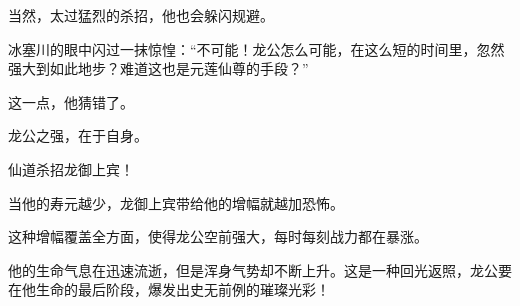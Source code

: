 \begin{this_body}
当然，太过猛烈的杀招，他也会躲闪规避。

冰塞川的眼中闪过一抹惊惶：“不可能！龙公怎么可能，在这么短的时间里，忽然强大到如此地步？难道这也是元莲仙尊的手段？”

这一点，他猜错了。

龙公之强，在于自身。

仙道杀招龙御上宾！

当他的寿元越少，龙御上宾带给他的增幅就越加恐怖。

这种增幅覆盖全方面，使得龙公空前强大，每时每刻战力都在暴涨。

他的生命气息在迅速流逝，但是浑身气势却不断上升。这是一种回光返照，龙公要在他生命的最后阶段，爆发出史无前例的璀璨光彩！

\end{this_body}

